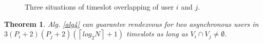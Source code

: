 \documentclass[10pt, conference, letterpaper]{IEEEtran}
\newtheorem{theorem}{Theorem}
\begin{document}
\begin{figure}
\centering
{}
\caption{Three situations of timeslot overlapping of user $i$ and $j$.}
\label{sit-alg4}
\end{figure}

\begin{theorem}
\label{theo-alg4}
Alg. \ref{alg4} can guarantee rendezvous for two asynchronous users in $3(P_i+2)(P_j+2)(\left \lceil log_2N \right \rceil +1)$ timeslots as long as $V_i \cap V_j \ne \emptyset$.
\end{theorem}
\end{document}
